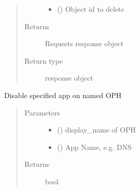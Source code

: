 \documentclass[letterpaper,10pt,english]{sphinxmanual}
\begin{document}
\begin{fulllineitems}
\begin{fulllineitems}
\begin{quote}
\begin{description}
\begin{itemize}
\item {} 
\sphinxAtStartPar
{} () \textendash{} Object id to delete

\end{itemize}

\item[{Returns}] \leavevmode
\sphinxAtStartPar
Requests response object

\item[{Return type}] \leavevmode
\sphinxAtStartPar
response object

\end{description}\end{quote}

\end{fulllineitems}


\begin{fulllineitems}
\label{\detokenize{b1oph-class:bloxone.b1oph.disable_app}}
\sphinxAtStartPar
Disable specified app on named OPH
\begin{quote}\begin{description}
\item[{Parameters}] \leavevmode\begin{itemize}
\item {} 
\sphinxAtStartPar
{} () \textendash{} display\_name of OPH

\item {} 
\sphinxAtStartPar
{} () \textendash{} App Name, e.g. DNS

\end{itemize}

\item[{Returns}] \leavevmode
\sphinxAtStartPar
bool

\end{description}\end{quote}

\end{fulllineitems}


\end{fulllineitems}
\end{document}

